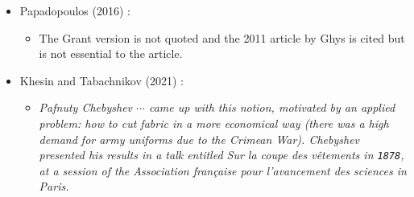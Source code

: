 \documentclass[12pt]{article}
\begin{document}
\begin{itemize}
\begin{itemize}

\item[]{\it The first few lines of this paper, as well as a relatively long appendix, contain some history of the subject. One learns that Chebyshev, in order to supplement his income as a university professor, signed a contract with a textile businessman, for a second job where the goal was to find methods of cutting military uniforms (for which there was a huge demand at that time) that would minimize fabric loss. This was Chebyshev's motivation for studying the cutting of garments. It is not clear to what extent Chebyshev helped the profession of clothing design, because he immediately got more interested in the mathematical aspect of the theory. This led Chebyshev to write a paper which bears the title of the paper under review, and a book which seems to be very difficult to locate. Chebyshev's paper, written in French, is reproduced in the appendix of the paper under review. In particular, Chebyshev developed the theory of what are now called {\sc Chebyshev nets}.}

\item[$\bullet$]The review cites Ghys (2011) \cite{Ghys2011}.

\end{itemize}

\item[]Papadopoulos (2016) \cite{Papadopoulos2016}:

\begin{itemize}

\item[]The Grant version is not quoted and the 2011 article by Ghys \cite{Ghys2011} is cited but is not essential to the article.

\end{itemize}

\item[]Khesin and Tabachnikov (2021) \cite{Khesin2021}:

\begin{itemize}

\item[]{\it Pafnuty Chebyshev $\cdots$ came up with this notion, motivated by an applied problem: how to cut fabric in a more economical way (there was a high demand for army uniforms due to the Crimean War). Chebyshev presented his results in a talk entitled {\sc Sur la coupe des v\^etements} in {\tt 1878}, at a session of the {\sc Association fran\c caise pour l'avance\-ment des sciences in Paris}.}


\end{itemize}
\end{itemize}
\end{document}
